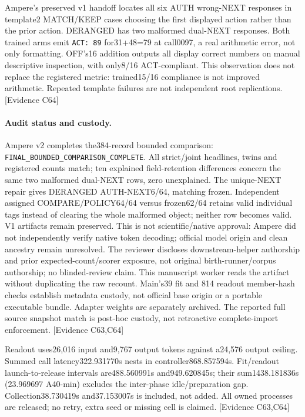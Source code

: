 \documentclass[11pt]{article}
\newcommand{\ev}[1]{\textsf{[Evidence #1]}}
\begin{document}
Ampere's preserved v1 handoff locates all six AUTH wrong-NEXT responses in template2
MATCH/KEEP cases choosing the first displayed action rather than the prior
action. DERANGED has two malformed dual-NEXT responses. Both trained arms
emit \texttt{ACT: 89} for31+48=79 at call0097, a real arithmetic error, not
only formatting. OFF's16 addition outputs all display correct numbers on manual
descriptive inspection, with only8/16 ACT-compliant. This observation does not
replace the registered metric: trained15/16 compliance is not improved
arithmetic. Repeated template failures are not independent root replications.
\ev{C64}

\paragraph{Audit status and custody.} Ampere v2 completes the384-record bounded
comparison: \texttt{FINAL\_BOUNDED\_COMPARISON\_COMPLETE}. All strict/joint
headlines, twins and registered counts match; ten explained field-retention
differences concern the same two malformed dual-NEXT rows, zero unexplained.
The unique-NEXT repair gives DERANGED AUTH-NEXT6/64, matching frozen. Independent
assigned COMPARE/POLICY64/64 versus frozen62/64 retains valid individual tags
instead of clearing the whole malformed object; neither row becomes valid.
V1 artifacts remain preserved. This is not scientific/native approval: Ampere
did not independently verify native token decoding; official model origin and
clean ancestry remain unresolved. The reviewer discloses
downstream-helper authorship and prior expected-count/scorer exposure, not
original birth-runner/corpus authorship; no blinded-review claim. This manuscript
worker reads the artifact without duplicating the raw recount. Main's39 fit and
814 readout member-hash checks establish metadata custody, not official base
origin or a portable executable bundle. Adapter weights are separately archived.
The reported full source snapshot match is post-hoc custody, not retroactive
complete-import enforcement. \ev{C63,C64}

Readout uses26{,}016 input and9{,}767 output tokens against a24{,}576 output
ceiling. Summed call latency322.931770s nests in controller868.857594s.
Fit/readout launch-to-release intervals are488.560991s and949.620845s; their
sum1438.181836s (23.969697 A40-min) excludes the inter-phase idle/preparation
gap. Collection38.730419s and37.153007s is included, not added. All owned
processes are released; no retry, extra seed or missing cell is claimed.
\ev{C63,C64}
\end{document}
